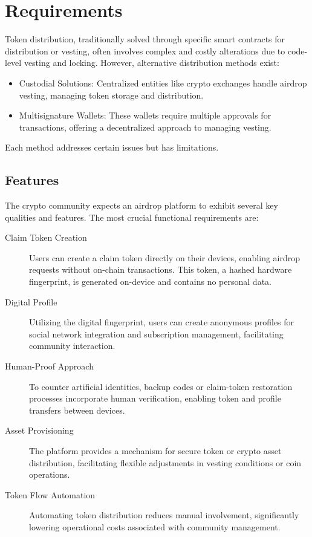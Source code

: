 \documentclass[12pt,oneside]{article}
\begin{document}
\section{Requirements}
\label{sec:requirements}

Token distribution, traditionally solved through specific smart contracts for distribution or vesting, often involves complex and costly alterations due to code-level 
vesting and locking. However, alternative distribution methods exist:
\begin{itemize}
  \item Custodial Solutions: Centralized entities like crypto exchanges handle airdrop vesting, managing token storage and distribution.
  \item Multisignature Wallets: These wallets require multiple approvals for transactions, offering a decentralized approach to managing vesting.
\end{itemize}
Each method addresses certain issues but has limitations.

\subsection{Features}
\label{sec:features}

The crypto community expects an airdrop platform to exhibit
several key qualities and features. The most crucial functional
requirements are:

\begin{description}
  \item[Claim Token Creation]
  Users can create a claim token directly on their devices, enabling airdrop requests without on-chain transactions. This token, a hashed hardware fingerprint, is generated on-device and contains no personal data.

  \item[Digital Profile]
  Utilizing the digital fingerprint, users can create anonymous profiles for social network integration and subscription management, facilitating community interaction.

  \item[Human-Proof Approach]
  To counter artificial identities, backup codes or claim-token restoration processes incorporate human verification, enabling token and profile transfers between devices.

  \item[Asset Provisioning]
  The platform provides a mechanism for secure token or crypto asset distribution, facilitating flexible adjustments in vesting conditions or coin operations.

  \item[Token Flow Automation]
  Automating token distribution reduces manual involvement, significantly lowering operational costs associated with community management.
\end{description}
\end{document}
